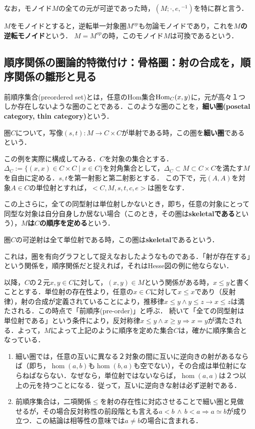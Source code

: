 \documentclass[uplatex, dvipdfmx]{jsreport}
\begin{document}
なお，モノイド$M$の全ての元が可逆であった時，$(M;\cdot,e,{}^{-1})$を特に群と言う．

$M$をモノイドとすると，逆転単一対象圏$M^{op}$も勿論モノイドであり，これを\textbf{$M$の逆転モノイド}という．
$M=M^{op}$の時，このモノイド$M$は可換であるという．

\subsection{順序関係の圏論的特徴付け：骨格圏：射の合成を，順序関係の雛形と見る}

前順序集合(preordered set)とは，任意のHom集合$\mathrm{Hom}_C(x,y)$に，元が高々１つしか存在しないような圏のことである．このような圏のことを，\textbf{細い圏(posetal category, thin category)}という．
\begin{definition}
    圏$C$について，写像$(s,t):M\to C\times C$が単射である時，この圏を\textbf{細い圏}であるという．
\end{definition}
この例を実際に構成してみる．$C$を対象の集合とする．$\Delta_C :=\{ (x,x)\in C\times C \mid x\in C \}$を対角集合として，$\Delta_C \subset M\subset C\times C$を満たす$M$を自由に定める．$s,t$を第一射影と第二射影とする．
この下で，元$(A,A)$を対象$A\in C$の単位射とすれば，$<C,M,s,t,c,e>$は圏をなす．

この上さらに，全ての同型射は単位射しかないとき，即ち，任意の対象にとって同型な対象は自分自身しか居ない場合（このとき，その圏は\textbf{skeletalである}という），\textbf{$M$は$C$の順序を定める}という．
\begin{definition}[skeletal]
    圏$C$の可逆射は全て単位射である時，この圏は\textbf{skeletal}であるという．
\end{definition}
これは，圏を有向グラフとして捉えなおしたようなものである．「射が存在する」という関係を，順序関係だと捉えれば，それはHesse図の例に他ならない．

以降，$C$の２元$x,y\in C$に対して，$(x,y)\in M$という関係がある時，$x\le y$と書くこととする．単位射の存在性より，任意の$x\in C$に対して$x\le x$であり（反射律），射の合成が定義されていることにより，推移律$x\le y \wedge y\le z \rightarrow x\le z$は満たされる．この時点で「前順序(pre-order)」と呼ぶ．
続いて「全ての同型射は単位射である」という条件により，反対称律$x\le y \wedge x\ge y \Rightarrow x=y$が満たされる．よって，$M$によって上記のように順序を定めた集合$C$は，確かに順序集合となっている．

\begin{remark}[勘違いしやすい点]\mbox{}
    \begin{enumerate}
        \item 細い圏では，任意の互いに異なる２対象の間に互いに逆向きの射があるならば（即ち，$\hom(a,b)$も$\hom(b,a)$も空でない），その合成は単位射にならねばならない．なぜなら，単位射ではないならば，$\hom(a,a)$は２つ以上の元を持つことになる．従って，互いに逆向きな射は必ず逆射である．
        \item 前順序集合は，二項関係$\le$を射の存在性に対応させることで細い圏と見做せるが，その場合反対称性の前段階とも言える$a<b\,\wedge\,b<a\Rightarrow a\simeq b$が成り立つ．この結論は相等性の意味では$a\neq b$の場合に含まれる．
    \end{enumerate}
\end{remark}
\end{document}
